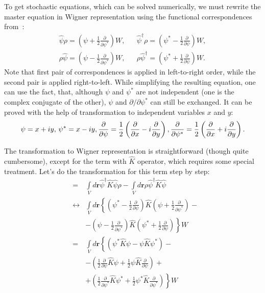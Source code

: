 \documentclass[12pt,notitlepage]{report}
\begin{document}
To get stochastic equations, which can be solved numerically,
we must rewrite the master equation in Wigner representation using the functional correspondences
from~\cite{gardiner_quantum_noise}:
\begin{eqnarray*}
\hat{\psi} \rho = \left( \psi + \frac{1}{2} \frac{\partial}{\partial \psi^*} \right) W, & &
\hat{\psi}^\dagger \rho = \left( \psi^* - \frac{1}{2} \frac{\partial}{\partial \psi} \right) W, \\
\rho \hat{\psi} = \left( \psi - \frac{1}{2} \frac{\partial}{\partial \psi^*} \right) W, & &
\rho \hat{\psi}^\dagger = \left( \psi^* + \frac{1}{2} \frac{\partial}{\partial \psi} \right) W.
\end{eqnarray*}
Note that first pair of correspondences is applied in left-to-right order, while the second pair is applied right-to-left.
While simplifying the resulting equation, one can use the fact, that, although $\psi$ and $\psi^*$ are not independent
(one is the complex conjugate of the other), $\psi$ and $\partial/\partial\psi^*$ can still be exchanged.
It can be proved with the help of transformation to independent variables $x$ and $y$:
\[
\psi = x + iy,\, \psi^* = x - iy,\, \\
\frac{\partial}{\partial\psi} = \frac{1}{2} \left( \frac{\partial}{\partial x} - i \frac{\partial}{\partial y} \right),\, \\
\frac{\partial}{\partial\psi^*} = \frac{1}{2} \left( \frac{\partial}{\partial x} + i \frac{\partial}{\partial y} \right).
\]

The transformation to Wigner representation is straightforward (though quite cumbersome),
except for the term with $\hat{K}$ operator, which requires some special treatment.
Let's do the transformation for this term step by step:
\begin{eqnarray}
[ \int\limits_V \hat{\psi}^\dagger \hat{K} \hat{\psi}, \rho ]
& = & \int\limits_V d\mathbf{r} \hat{\psi}^\dagger \hat{K} \hat{\psi} \rho - \int\limits_V d\mathbf{r} \rho \hat{\psi}^\dagger \hat{K} \hat{\psi} \nonumber \\
& \leftrightarrow & \int\limits_V d\mathbf{r} \left\{ \left( \psi^* - \frac{1}{2}\frac{\partial}{\partial\psi}\right) \hat{K} \left( \psi + \frac{1}{2}\frac{\partial}{\partial\psi^*} \right) - \nonumber \right. \\
& & \left. - \left( \psi - \frac{1}{2}\frac{\partial}{\partial\psi^*}\right) \hat{K} \left( \psi^* + \frac{1}{2}\frac{\partial}{\partial\psi}  \right) \right\} W \nonumber \\
& = & \int\limits_V d\mathbf{r} \left\{ \left( \psi^* \hat{K} \psi - \psi \hat{K} \psi^* \right) -  \right. \label{annihilating_psi_K_psi} \\
& & \left. - \left( \frac{1}{2}\frac{\partial}{\partial\psi} \hat{K} \psi +
\frac{1}{2} \psi \hat{K} \frac{\partial}{\partial\psi} \right) \right. + \label{dpsi_K_psi_term} \\
& & \left. + \left( \frac{1}{2}\frac{\partial}{\partial\psi^*} \hat{K} \psi^* +
\frac{1}{2} \psi^* \hat{K} \frac{\partial}{\partial\psi^*} \right) \right\} W \label{dpsi_star_K_psi_star_term}
\end{eqnarray}
\end{document}
